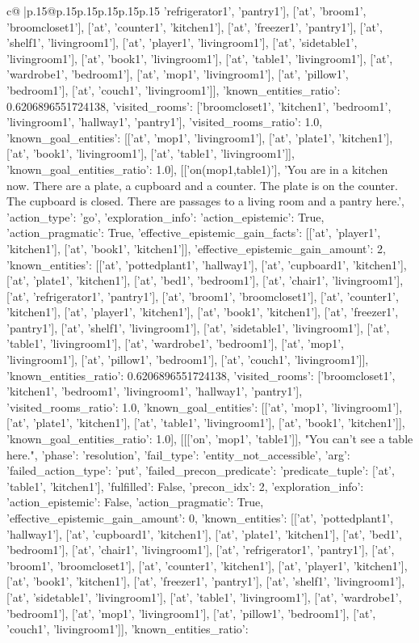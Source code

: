 \documentclass{article}
\begin{document}
{\begin{supertabular}{c@{$\;$}|p{.15\linewidth}@{}p{.15\linewidth}p{.15\linewidth}p{.15\linewidth}p{.15\linewidth}p{.15\linewidth}}
{{{'refrigerator1', 'pantry1'], ['at', 'broom1', 'broomcloset1'], ['at', 'counter1', 'kitchen1'], ['at', 'freezer1', 'pantry1'], ['at', 'shelf1', 'livingroom1'], ['at', 'player1', 'livingroom1'], ['at', 'sidetable1', 'livingroom1'], ['at', 'book1', 'livingroom1'], ['at', 'table1', 'livingroom1'], ['at', 'wardrobe1', 'bedroom1'], ['at', 'mop1', 'livingroom1'], ['at', 'pillow1', 'bedroom1'], ['at', 'couch1', 'livingroom1']], 'known_entities_ratio': 0.6206896551724138, 'visited_rooms': ['broomcloset1', 'kitchen1', 'bedroom1', 'livingroom1', 'hallway1', 'pantry1'], 'visited_rooms_ratio': 1.0, 'known_goal_entities': [['at', 'mop1', 'livingroom1'], ['at', 'plate1', 'kitchen1'], ['at', 'book1', 'livingroom1'], ['at', 'table1', 'livingroom1']], 'known_goal_entities_ratio': 1.0}}], [['on(mop1,table1)'], 'You are in a kitchen now. There are a plate, a cupboard and a counter. The plate is on the counter. The cupboard is closed. There are passages to a living room and a pantry here.', {'action_type': 'go', 'exploration_info': {'action_epistemic': True, 'action_pragmatic': True, 'effective_epistemic_gain_facts': [['at', 'player1', 'kitchen1'], ['at', 'book1', 'kitchen1']], 'effective_epistemic_gain_amount': 2, 'known_entities': [['at', 'pottedplant1', 'hallway1'], ['at', 'cupboard1', 'kitchen1'], ['at', 'plate1', 'kitchen1'], ['at', 'bed1', 'bedroom1'], ['at', 'chair1', 'livingroom1'], ['at', 'refrigerator1', 'pantry1'], ['at', 'broom1', 'broomcloset1'], ['at', 'counter1', 'kitchen1'], ['at', 'player1', 'kitchen1'], ['at', 'book1', 'kitchen1'], ['at', 'freezer1', 'pantry1'], ['at', 'shelf1', 'livingroom1'], ['at', 'sidetable1', 'livingroom1'], ['at', 'table1', 'livingroom1'], ['at', 'wardrobe1', 'bedroom1'], ['at', 'mop1', 'livingroom1'], ['at', 'pillow1', 'bedroom1'], ['at', 'couch1', 'livingroom1']], 'known_entities_ratio': 0.6206896551724138, 'visited_rooms': ['broomcloset1', 'kitchen1', 'bedroom1', 'livingroom1', 'hallway1', 'pantry1'], 'visited_rooms_ratio': 1.0, 'known_goal_entities': [['at', 'mop1', 'livingroom1'], ['at', 'plate1', 'kitchen1'], ['at', 'table1', 'livingroom1'], ['at', 'book1', 'kitchen1']], 'known_goal_entities_ratio': 1.0}}], [[['on', 'mop1', 'table1']], "You can't see a table here.", {'phase': 'resolution', 'fail_type': 'entity_not_accessible', 'arg': {'failed_action_type': 'put', 'failed_precon_predicate': {'predicate_tuple': ['at', 'table1', 'kitchen1'], 'fulfilled': False, 'precon_idx': 2}}, 'exploration_info': {'action_epistemic': False, 'action_pragmatic': True, 'effective_epistemic_gain_amount': 0, 'known_entities': [['at', 'pottedplant1', 'hallway1'], ['at', 'cupboard1', 'kitchen1'], ['at', 'plate1', 'kitchen1'], ['at', 'bed1', 'bedroom1'], ['at', 'chair1', 'livingroom1'], ['at', 'refrigerator1', 'pantry1'], ['at', 'broom1', 'broomcloset1'], ['at', 'counter1', 'kitchen1'], ['at', 'player1', 'kitchen1'], ['at', 'book1', 'kitchen1'], ['at', 'freezer1', 'pantry1'], ['at', 'shelf1', 'livingroom1'], ['at', 'sidetable1', 'livingroom1'], ['at', 'table1', 'livingroom1'], ['at', 'wardrobe1', 'bedroom1'], ['at', 'mop1', 'livingroom1'], ['at', 'pillow1', 'bedroom1'], ['at', 'couch1', 'livingroom1']], 'known_entities_ratio': }}}
\end{supertabular}}
\end{document}
